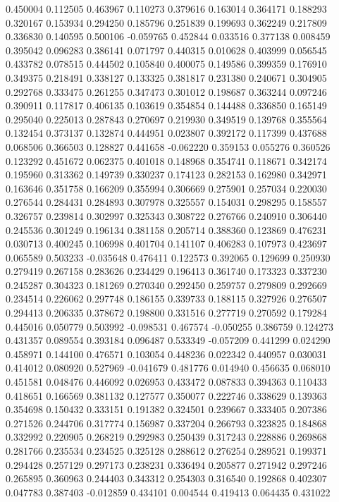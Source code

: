 0.450004
0.112505
0.463967
0.110273
0.379616
0.163014
0.364171
0.188293
0.320167
0.153934
0.294250
0.185796
0.251839
0.199693
0.362249
0.217809
0.336830
0.140595
0.500106
-0.059765
0.452844
0.033516
0.377138
0.008459
0.395042
0.096283
0.386141
0.071797
0.440315
0.010628
0.403999
0.056545
0.433782
0.078515
0.444502
0.105840
0.400075
0.149586
0.399359
0.176910
0.349375
0.218491
0.338127
0.133325
0.381817
0.231380
0.240671
0.304905
0.292768
0.333475
0.261255
0.347473
0.301012
0.198687
0.363244
0.097246
0.390911
0.117817
0.406135
0.103619
0.354854
0.144488
0.336850
0.165149
0.295040
0.225013
0.287843
0.270697
0.219930
0.349519
0.139768
0.355564
0.132454
0.373137
0.132874
0.444951
0.023807
0.392172
0.117399
0.437688
0.068506
0.366503
0.128827
0.441658
-0.062220
0.359153
0.055276
0.360526
0.123292
0.451672
0.062375
0.401018
0.148968
0.354741
0.118671
0.342174
0.195960
0.313362
0.149739
0.330237
0.174123
0.282153
0.162980
0.342971
0.163646
0.351758
0.166209
0.355994
0.306669
0.275901
0.257034
0.220030
0.276544
0.284431
0.284893
0.307978
0.325557
0.154031
0.298295
0.158557
0.326757
0.239814
0.302997
0.325343
0.308722
0.276766
0.240910
0.306440
0.245536
0.301249
0.196134
0.381158
0.205714
0.388360
0.123869
0.476231
0.030713
0.400245
0.106998
0.401704
0.141107
0.406283
0.107973
0.423697
0.065589
0.503233
-0.035648
0.476411
0.122573
0.392065
0.129699
0.250930
0.279419
0.267158
0.283626
0.234429
0.196413
0.361740
0.173323
0.337230
0.245287
0.304323
0.181269
0.270340
0.292450
0.259757
0.279809
0.292669
0.234514
0.226062
0.297748
0.186155
0.339733
0.188115
0.327926
0.276507
0.294413
0.206335
0.378672
0.198800
0.331516
0.277719
0.270592
0.179284
0.445016
0.050779
0.503992
-0.098531
0.467574
-0.050255
0.386759
0.124273
0.431357
0.089554
0.393184
0.096487
0.533349
-0.057209
0.441299
0.024290
0.458971
0.144100
0.476571
0.103054
0.448236
0.022342
0.440957
0.030031
0.414012
0.080920
0.527969
-0.041679
0.481776
0.014940
0.456635
0.068010
0.451581
0.048476
0.446092
0.026953
0.433472
0.087833
0.394363
0.110433
0.418651
0.166569
0.381132
0.127577
0.350077
0.222746
0.338629
0.139363
0.354698
0.150432
0.333151
0.191382
0.324501
0.239667
0.333405
0.207386
0.271526
0.244706
0.317774
0.156987
0.337204
0.266793
0.323825
0.184868
0.332992
0.220905
0.268219
0.292983
0.250439
0.317243
0.228886
0.269868
0.281766
0.235534
0.234525
0.325128
0.288612
0.276254
0.289521
0.199371
0.294428
0.257129
0.297173
0.238231
0.336494
0.205877
0.271942
0.297246
0.265895
0.360963
0.244403
0.343312
0.254303
0.316540
0.192868
0.402307
0.047783
0.387403
-0.012859
0.434101
0.004544
0.419413
0.064435
0.431022
